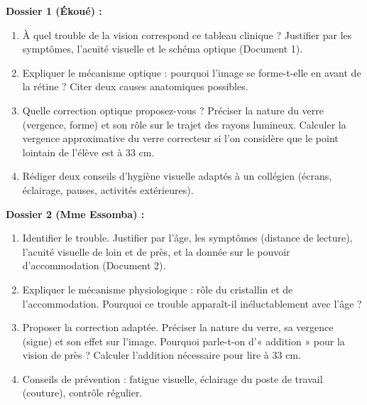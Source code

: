 \documentclass[11pt]{article}
\begin{document}
\vspace{0.2cm}
\noindent\textbf{Dossier 1 (Ékoué) :}
\begin{enumerate}
    \item À quel trouble de la vision correspond ce tableau clinique ? Justifier par les symptômes, l'acuité visuelle et le schéma optique (Document 1).
    \item Expliquer le mécanisme optique : pourquoi l'image se forme-t-elle en avant de la rétine ? Citer deux causes anatomiques possibles.
    \item Quelle correction optique proposez-vous ? Préciser la nature du verre (vergence, forme) et son rôle sur le trajet des rayons lumineux. Calculer la vergence approximative du verre correcteur si l'on considère que le point lointain de l'élève est à $33$ cm.
    \item Rédiger deux conseils d'hygiène visuelle adaptés à un collégien (écrans, éclairage, pauses, activités extérieures).
\end{enumerate}

\vspace{0.2cm}
\noindent\textbf{Dossier 2 (Mme Essomba) :}
\begin{enumerate}
    \item Identifier le trouble. Justifier par l'âge, les symptômes (distance de lecture), l'acuité visuelle de loin et de près, et la donnée sur le pouvoir d'accommodation (Document 2).
    \item Expliquer le mécanisme physiologique : rôle du cristallin et de l'accommodation. Pourquoi ce trouble apparaît-il inéluctablement avec l'âge ?
    \item Proposer la correction adaptée. Préciser la nature du verre, sa vergence (signe) et son effet sur l'image. Pourquoi parle-t-on d'« addition » pour la vision de près ? Calculer l'addition nécessaire pour lire à $33$ cm.
    \item Conseils de prévention : fatigue visuelle, éclairage du poste de travail (couture), contrôle régulier.
\end{enumerate}
\end{document}
